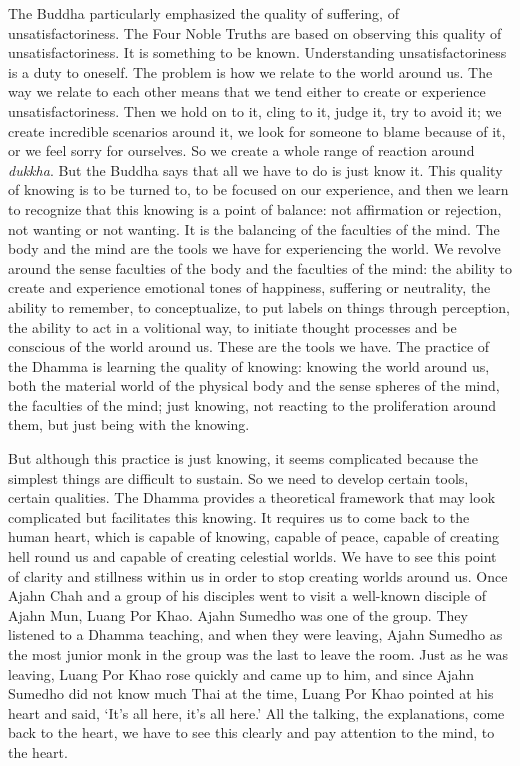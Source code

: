 The Buddha particularly emphasized the quality of suffering, of
unsatisfactoriness. The Four Noble Truths are based on observing this
quality of unsatisfactoriness. It is something to be known. 
Understanding unsatisfactoriness is a duty to oneself. The problem is
how we relate to the world around us. The way we relate to each other
means that we tend either to create or experience unsatisfactoriness. 
Then we hold on to it, cling to it, judge it, try to avoid it; we create
incredible scenarios around it, we look for someone to blame because of
it, or we feel sorry for ourselves. So we create a whole range of
reaction around \emph{dukkha}. But the Buddha says that all we have to
do is just know it. This quality of knowing is to be turned to, to be
focused on our experience, and then we learn to recognize that this
knowing is a point of balance: not affirmation or rejection, not wanting
or not wanting. It is the balancing of the faculties of the mind. The
body and the mind are the tools we have for experiencing the world. We
revolve around the sense faculties of the body and the faculties of the
mind: the ability to create and experience emotional tones of happiness, 
suffering or neutrality, the ability to remember, to conceptualize, to
put labels on things through perception, the ability to act in a
volitional way, to initiate thought processes and be conscious of the
world around us. These are the tools we have. The practice of the Dhamma
is learning the quality of knowing: knowing the world around us, both
the material world of the physical body and the sense spheres of the
mind, the faculties of the mind; just knowing, not reacting to the
proliferation around them, but just being with the knowing. 

But although this practice is just knowing, it seems complicated because
the simplest things are difficult to sustain. So we need to develop
certain tools, certain qualities. The Dhamma provides a theoretical
framework that may look complicated but facilitates this knowing. It
requires us to come back to the human heart, which is capable of
knowing, capable of peace, capable of creating hell round us and capable
of creating celestial worlds. We have to see this point of clarity and
stillness within us in order to stop creating worlds around us. Once
Ajahn Chah and a group of his disciples went to visit a well-known
disciple of Ajahn Mun, Luang Por Khao. Ajahn Sumedho was one of the
group. They listened to a Dhamma teaching, and when they were leaving, 
Ajahn Sumedho as the most junior monk in the group was the last to leave
the room. Just as he was leaving, Luang Por Khao rose quickly and came up
to him, and since Ajahn Sumedho did not know much Thai at the time, 
Luang Por Khao pointed at his heart and said, `It's all here, it's all
here.' All the talking, the explanations, come back to the heart, we
have to see this clearly and pay attention to the mind, to the heart. 

